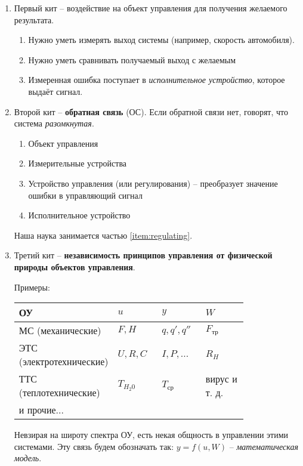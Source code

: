 \documentclass[main.tex]{subfiles}
\begin{document}
\begin{enumerate}
	\item Первый кит -- воздействие на объект управления для получения желаемого результата.
	\begin{enumerate}[noitemsep]
		\item Нужно уметь измерять выход системы (например, скорость автомобиля).
		\item Нужно уметь сравнивать получаемый выход с желаемым
		\item Измеренная ошибка поступает в \emph{исполнительное устройство}, которое выдаёт сигнал.
	\end{enumerate}
	\item Второй кит  -- \textbf{обратная связь} (ОС).
    Если обратной связи нет, говорят, что система \emph{разомкнутая}.
	\begin{enumerate}[noitemsep]
		\item Объект управления
		\item Измерительные устройства
		\item Устройство управления (или регулирования) -- преобразует значение ошибки в управляющий сигнал \label{item:regulating}
		\item  Исполнительное устройство
	\end{enumerate}

	Наша наука занимается частью \ref{item:regulating}.
	\item Третий кит -- \textbf{независимость принципов управления от физической природы объектов управления}.

	Примеры:

	\begin{tabular}{m{0.2\linewidth} | m{0.2\linewidth} | m{0.2\linewidth} | m{0.2\linewidth}}
		\hline \hline
		ОУ & $ u $ & $ y $ & $ W $ \\
		\hline
		МС (механические) & $ F, H $ & $ q, q', q'' $ & $ F_{\text{тр}} $ \\
		ЭТС (электротехнические) & $ U, R, C $ & $ I, P, ... $ & $ R_H $ \\
		ТТС (теплотехнические) & $ T_{H_2 0} $ & $ T_{\text{ср}} $ & вирус и т. д. \\
		и прочие... & & & \\
		\hline
	\end{tabular}

	Невзирая на широту спектра ОУ, есть некая общность в управлении этими системами. Эту связь будем обозначать так: $ y = f(u, W) $ -- \emph{математическая модель}.


\end{enumerate}
\end{document}
